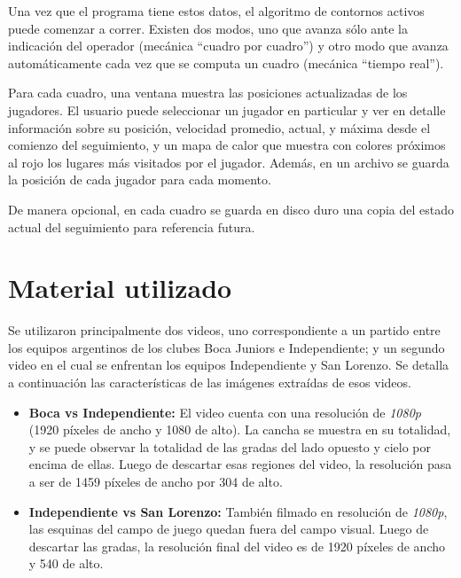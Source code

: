 Una vez que el programa tiene estos datos, el algoritmo de contornos activos puede comenzar a correr. Existen dos modos, uno que avanza sólo ante la indicación del operador (mecánica ``cuadro por cuadro'') y otro modo que avanza automáticamente cada vez que se computa un cuadro (mecánica ``tiempo real'').  %

Para cada cuadro, una ventana muestra las posiciones actualizadas de los jugadores. El usuario puede seleccionar un jugador en particular y ver en detalle información sobre su posición, velocidad promedio, actual, y máxima desde el comienzo del seguimiento, y un mapa de calor que muestra con colores próximos al rojo los lugares más visitados por el jugador. Además, en un archivo se guarda la posición de cada jugador para cada momento.

De manera opcional, en cada cuadro se guarda en disco duro una copia del estado actual del seguimiento para referencia futura.

\section{Material utilizado}

Se utilizaron principalmente dos videos, uno correspondiente a un partido entre los equipos argentinos de los clubes Boca Juniors e Independiente; y un segundo video en el cual se enfrentan los equipos Independiente y San Lorenzo. Se detalla a continuación las características de las imágenes extraídas de esos videos.

\begin{itemize}
  \item \textbf{Boca vs Independiente:} El video cuenta con una resolución de \textit{1080p} (1920 píxeles de ancho y 1080 de alto). La cancha se muestra en su totalidad, y se puede observar la totalidad de las gradas del lado opuesto y cielo por encima de ellas. Luego de descartar esas regiones del video, la resolución pasa a ser de 1459 píxeles de ancho por 304 de alto. %
  \item \textbf{Independiente vs San Lorenzo:} También filmado en resolución de \textit{1080p}, las esquinas del campo de juego quedan fuera del campo visual. Luego de descartar las gradas, la resolución final del video es de 1920 píxeles de ancho y 540 de alto. %
\end{itemize}

